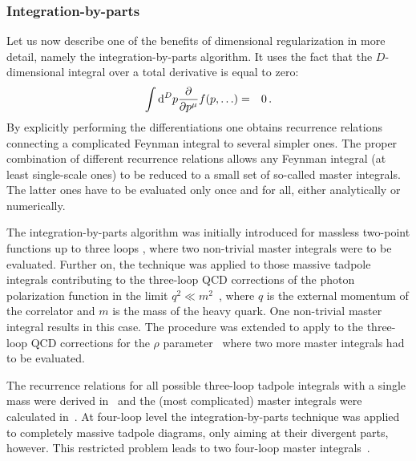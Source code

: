 \subsubsection{Integration-by-parts\label{sec::IP}}
%
Let us now describe one of the benefits of dimensional regularization
in more detail, namely the integration-by-parts algorithm.  It uses the
fact that the $D$-dimensional integral over a total derivative is equal
to zero:
\begin{eqnarray}
  \int{\rm d}^D p {\partial\over \partial p^\mu} f(p,\ldots) &=& 0\,.
  \label{eqipgen}
\end{eqnarray}
By explicitly performing the differentiations one obtains recurrence
relations connecting a complicated Feynman integral to several simpler
ones.  The proper combination of different recurrence relations allows
any Feynman integral (at least single-scale ones) to be reduced to a
small set of so-called master integrals. The latter ones have to be
evaluated only once and for all, either analytically or numerically.

The integration-by-parts algorithm was initially introduced for 
massless two-point
functions up to three loops \cite{CheTka81}, where two non-trivial
master integrals were to be evaluated. Further
on, the technique was applied to those massive tadpole integrals
contributing to the three-loop QCD corrections of the photon
polarization function in the limit $q^2\ll m^2$~\cite{Bro92}, where $q$
is the external momentum of the correlator and $m$ is the mass of the
heavy quark. One non-trivial master integral results in this case.  The
procedure was extended to apply to the three-loop QCD corrections for
the $\rho$ parameter~\cite{Avd95,CheKueSte951} where two more master
integrals had to be evaluated.

The recurrence relations for all possible three-loop tadpole integrals
with a single mass were derived in~\cite{Avd97} and the (most
complicated) master integrals were calculated in~\cite{Bro98}.  At
four-loop level the integration-by-parts technique was applied to
completely massive
tadpole diagrams, only aiming at their divergent parts, however.  This
restricted problem leads to two four-loop master
integrals~\cite{RitVerLar97}.

